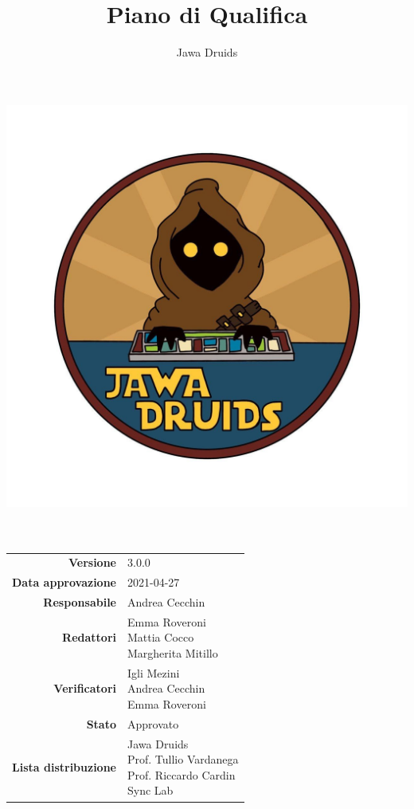 



	
	\makeatletter
	\begin{titlepage}
		\begin{center}
			\vspace*{-4cm}
			\author{Jawa Druids} 
			\title{Piano di Qualifica}
			\date{} %
			\includegraphics[width=0.5\linewidth]{../immagini/DRUIDSLOGO.jpg}\\[4ex]
			{\huge \bfseries  \@title }\\[2ex] 
			{\LARGE  \@author}\\[50ex]
			\vspace*{-9cm}
			\begin{table}[H]
				\renewcommand{\arraystretch}{1.4}
				\centering
				\begin{tabular}{r | l}
					\textbf{Versione} & 3.0.0 \\%
					\textbf{Data approvazione} & 2021-04-27\\
					\textbf{Responsabile} & Andrea Cecchin\\
					\textbf{Redattori} & \makecell[tl]{ Emma Roveroni \\ Mattia Cocco \\ Margherita Mitillo} \\
					\textbf{Verificatori} & \makecell[tl]{Igli Mezini \\ Andrea Cecchin \\ Emma Roveroni} \\
					\textbf{Stato} & Approvato\\
					\textbf{Lista distribuzione} & \makecell[tl]{Jawa Druids \\ Prof. Tullio Vardanega \\ Prof. Riccardo Cardin \\ Sync Lab}\\

\end{tabular}
\end{table}
\end{center}
\end{titlepage}

